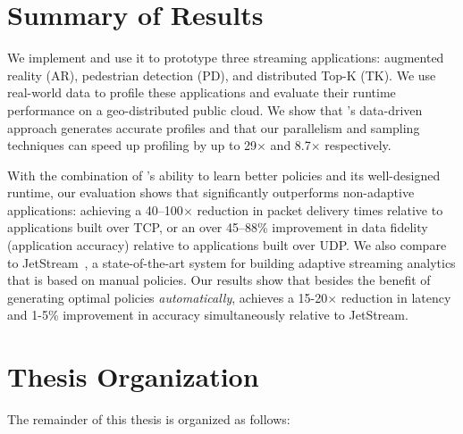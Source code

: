 \documentclass[thesis.tex]{subfiles}
\begin{document}
\section{Summary of Results}
\label{sec:summary-results-1}


We implement \awstream{} and use it to prototype three streaming applications:
augmented reality (AR), pedestrian detection (PD), and distributed Top-K
(TK). We use real-world data to profile these applications and evaluate their
runtime performance on a geo-distributed public cloud.  We show that
\awstream{}'s data-driven approach generates accurate profiles and that our
parallelism and sampling techniques can speed up profiling by up to 29$\times$
and 8.7$\times$ respectively.

With the combination of \awstream{}'s ability to learn better policies and its
well-designed runtime, our evaluation shows that \awstream{} significantly
outperforms non-adaptive applications: achieving a 40--100$\times$ reduction in
packet delivery times relative to applications built over TCP, or an over
45--88\% improvement in data fidelity (application accuracy) relative to
applications built over UDP. We also compare \awstream{} to
JetStream~\cite{rabkin2014aggregation}, a state-of-the-art system for building
adaptive streaming analytics that is based on manual policies. Our results show
that besides the benefit of generating optimal policies \textit{automatically},
\awstream{} achieves a 15-20$\times$ reduction in latency and 1-5\% improvement
in accuracy simultaneously relative to JetStream.

\section{Thesis Organization}
\label{sec:thesis-organization}

The remainder of this thesis is organized as follows:
\end{document}
